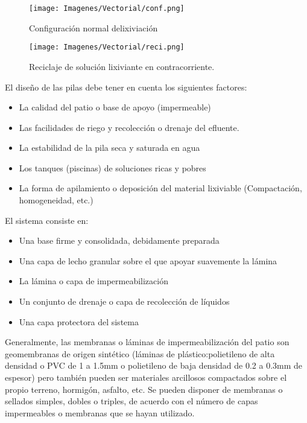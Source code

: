\begin{figure}[H]
 \centering
 \texttt{[image: Imagenes/Vectorial/conf.png]}
 \caption{Configuraci\'on normal delixiviaci\'on}
 \label{fig:cong}
\end{figure}

\begin{figure}[H]
 \centering
 \texttt{[image: Imagenes/Vectorial/reci.png]}
 \caption{Reciclaje de soluci\'on lixiviante en contracorriente.}
 \label{fig:reci}
\end{figure}

El dise\~no de las pilas debe tener en cuenta los siguientes factores:
\begin{itemize}
 \item La calidad del patio o base de apoyo (impermeable)
 \item Las facilidades de riego y recolecci\'on o drenaje del efluente.
 \item La estabilidad de la pila seca y saturada en agua
 \item Los tanques (piscinas) de soluciones ricas y pobres
 \item La forma de apilamiento o deposici\'on del material lixiviable (Compactaci\'on, homogeneidad, etc.)
\end{itemize}

El sistema consiste en:
\begin{itemize}
 \item Una base firme y consolidada, debidamente preparada
 \item Una capa de lecho granular sobre el que apoyar suavemente la l\'amina
 \item La l\'amina o capa de impermeabilizaci\'on
 \item Un conjunto de drenaje o capa de recolecci\'on de l\'iquidos
 \item Una capa protectora del sistema
\end{itemize}

Generalmente, las membranas o l\'aminas de impermeabilizaci\'on del patio son geomembranas de origen sint\'etico (l\'aminas de pl\'astico:polietileno de alta densidad o PVC de 1 a 1.5mm o polietileno de baja densidad de 0.2 a 0.3mm de espesor) pero tambi\'en pueden ser materiales arcillosos compactados sobre el propio terreno, hormig\'on, asfalto, etc. Se pueden disponer de membranas o sellados simples, dobles o triples, de acuerdo con el n\'umero de capas impermeables o membranas que se hayan utilizado.

